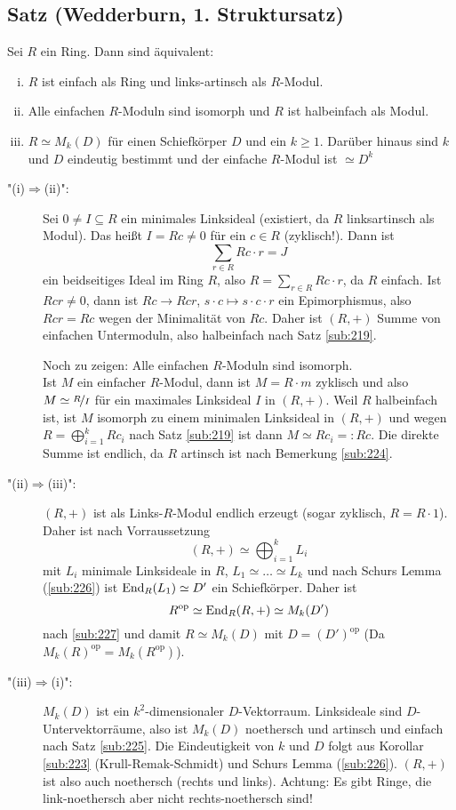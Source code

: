 \subsection{Satz (Wedderburn, 1. Struktursatz)} %
\label{sub:229}
Sei $R$ ein Ring. Dann sind äquivalent:
\begin{enumerate}[(i)]
	\item $R$ ist einfach als Ring und links-artinsch als $R$-Modul.
	\item Alle einfachen $R$-Moduln sind isomorph und $R$ ist halbeinfach als Modul. 
	\item $R \simeq M_k(D)$ für einen Schiefkörper $D$ und ein $k\ge 1$. 
	Darüber hinaus sind $k$ und $D$ eindeutig bestimmt und der einfache $R$-Modul ist  $\simeq D^k$
\end{enumerate}
\begin{description}
	\item["(i)$\Rightarrow $(ii)":] Sei $0  \not= I \subseteq R$ ein minimales Linksideal (existiert, da $R$ linksartinsch als Modul). Das heißt $I = R c \not= 0$ für ein
	$c \in R$ (zyklisch!). Dann ist 
	\[
		\sum_{r \in R} R c \cdot r = J
	\] 
	ein beidseitiges Ideal im Ring $R$, also $R= \sum_{r\in R} Rc\cdot r$, da $R$ einfach. Ist $Rc r \not= 0$, dann ist $R c \to R c r$, $s\cdot c\mapsto s \cdot c\cdot r$
	ein Epimorphismus, also $R c r = R c$ wegen der Minimalität von $R c$. Daher ist $(R,+)$ Summe von einfachen Untermoduln, also halbeinfach nach Satz \ref{sub:219}.
	
	Noch zu zeigen: Alle einfachen $R$-Moduln sind isomorph. \\
	Ist $M$ ein einfacher $R$-Modul, dann ist $M = R \cdot m$ zyklisch und also $M \simeq \nicefrac{R}{I}$ für ein maximales Linksideal $I$ in $(R,+)$. Weil $R$ halbeinfach
	ist, ist $M$ isomorph zu einem minimalen Linksideal in $(R,+)$ und wegen $R = \bigoplus_{i=1}^k R c_i$ nach Satz \ref{sub:219} ist dann $M \simeq R c_i =: Rc$. Die 
	direkte Summe ist endlich, da $R$ artinsch ist nach Bemerkung \ref{sub:224}.
	\item["(ii)$\Rightarrow $(iii)":]  $(R,+)$ ist als Links-$R$-Modul endlich erzeugt (sogar zyklisch, $R= R \cdot 1$). Daher ist nach Vorraussetzung 
	\[
		(R,+) \simeq \bigoplus_{i=1}^k L_i
	\]
	mit $L_i$ minimale Linksideale in $R$, $L_1 \simeq \ldots  \simeq L_k$ und nach Schurs Lemma (\ref{sub:226}) ist $\operatorname{End}_R(L_1) \simeq D'$ ein Schiefkörper. Daher ist
	\[
		R^\mathrm{op} \simeq \operatorname{End}_R(R,+) \simeq M_k(D')
	\]
	nach \ref{sub:227} und damit $R \simeq M_k(D)$ mit $D= (D')^\mathrm{op}$ (Da $M_k(R)^\mathrm{op} = M_k(R^\mathrm{op})$).
	\item["(iii)$\Rightarrow$(i)":] $M_k(D)$ ist ein $k^2$-dimensionaler $D$-Vektorraum. Linksideale sind $D$-Untervektorräume, also ist $M_k(D)$ noethersch und artinsch 
	und einfach nach Satz \ref{sub:225}. Die Eindeutigkeit von $k$ und $D$ folgt aus Korollar \ref{sub:223} (Krull-Remak-Schmidt) und Schurs Lemma (\ref{sub:226}). 
	\bewende
	$(R,+)$ ist also auch noethersch (rechts und links). Achtung: Es gibt Ringe, die link-noethersch aber nicht rechts-noethersch sind!
\end{description}

